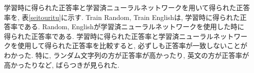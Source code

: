 \documentclass[twocolumn, a4paper]{ieicejsp}
\begin{document}
学習時に得られた正答率と学習済ニューラルネットワークを用いて得られた正答率を, 表\ref{seitouritu}に示す.
Train Random, Train Englishは, 学習時に得られた正答率である.
Random, Englishが学習済ニューラルネットワークを使用した時に得られた正答率である.
学習時に得られた正答率と学習済ニューラルネットワークを使用して得られた正答率を比較すると, 必ずしも正答率が一致しないことがわかった.
特に, ランダム文字列の方が正答率が高かったり, 英文の方が正答率が高かったりなど, ばらつきが見られた.

\end{document}

